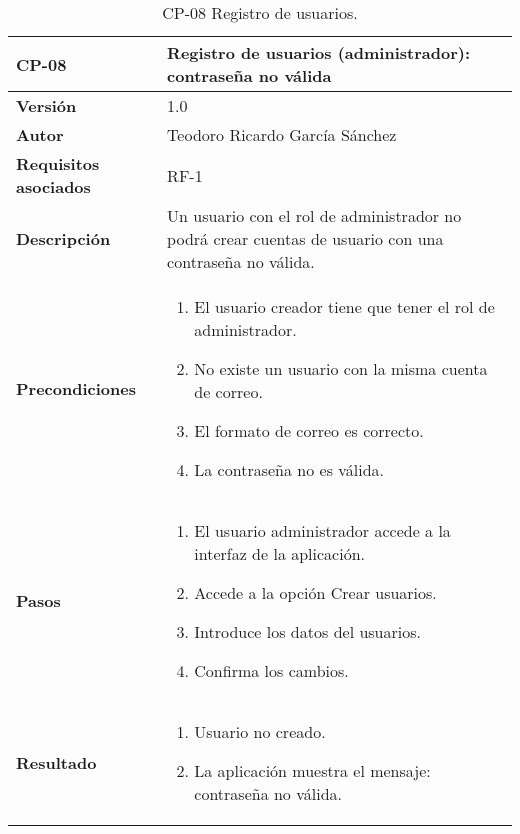 \begin{table}[p]
	\centering
	\begin{tabularx}{\linewidth}{ p{} p{} }
		\toprule
		\textbf{CP-08}    & \textbf{Registro de usuarios (administrador): contraseña no válida}\\
		\toprule
		\textbf{Versión}              & 1.0    \\
		\textbf{Autor}                & Teodoro Ricardo García Sánchez \\
		\textbf{Requisitos asociados} & RF-1 \\
		\textbf{Descripción}          & Un usuario con el rol de administrador no podrá crear cuentas de usuario con una contraseña no válida. \\
		\textbf{Precondiciones}         & 
		\begin{enumerate}
			\def\labelenumi{\arabic{enumi}.}
			\tightlist
			\item El usuario creador tiene que tener el rol de administrador.
			\item No existe un usuario con la misma cuenta de correo.
			\item El formato de correo es correcto.
			\item La contraseña no es válida.
		\end{enumerate}\\
		\textbf{Pasos}             &
		\begin{enumerate}
			\def\labelenumi{\arabic{enumi}.}
			\tightlist
			\item El usuario administrador accede a la interfaz de la aplicación.
			\item Accede a la opción Crear usuarios.
			\item Introduce los datos del usuarios.
			\item Confirma los cambios.
		\end{enumerate}\\
		\textbf{Resultado}          & 
		\begin{enumerate}
			\item Usuario no creado.
			\item La aplicación muestra el mensaje: contraseña no válida.
		\end{enumerate}\\
		\bottomrule
	\end{tabularx}
	\caption{CP-08 Registro de usuarios.}
\end{table}

